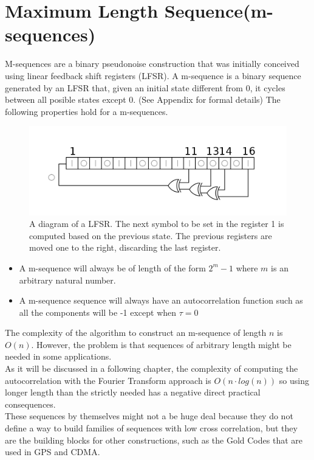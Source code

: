 \section{Maximum Length Sequence(m-sequences)}

M-sequences are a binary pseudonoise construction that was initially conceived using
linear feedback shift registers (LFSR). A m-sequence is a binary sequence generated
by an LFSR that, given an initial state different from 0, it cycles between all
posible states except 0. (See Appendix for formal details) The following properties
hold for a m-sequences.

\begin{figure}
  \includegraphics[scale=0.5]{Chapters/PRN_generation/LFSR-F16.svg.png}
  \caption{A diagram of a LFSR. The next symbol to be set in the register 1
  is computed based on the previous state. The previous registers are moved one
  to the right, discarding the last register.}
  \label{}
\end{figure}

\begin{itemize}
\item   A m-sequence will always be of length of the form $2^{m}-1$ where $m$ is an
  arbitrary natural number.
\item A m-sequence sequence will always have an autocorrelation function such as
  all the components will be -1 except when $\tau = 0$
\end{itemize}
The complexity of the algorithm to construct an m-sequence of length $n$ is $O(n)$.
However, the problem is that sequences of arbitrary length might be needed in some
applications.\\

 As it will be discussed in a following chapter, the complexity of computing the
autocorrelation with the Fourier Transform approach is $O(n \cdot log(n))$ so using longer length than the strictly needed  has a  negative direct practical consequences.\\

These sequences by themselves might not a be huge deal because they do not define a way to build families of sequences with low cross correlation, but they are the
building blocks for other constructions, such as the Gold Codes that are used in GPS and  CDMA.
